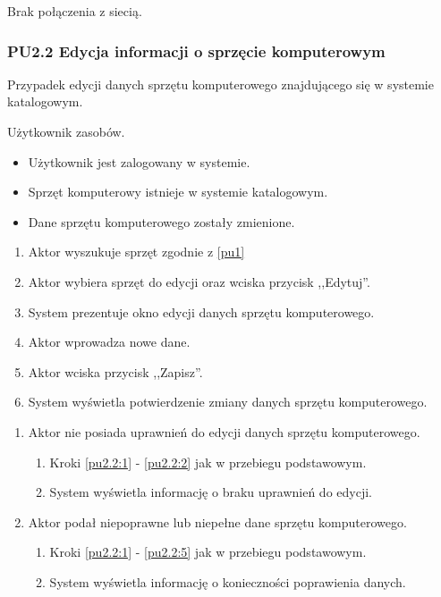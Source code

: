 Brak połączenia z siecią.



\subsubsection{PU2.2 Edycja informacji o sprzęcie komputerowym}

Przypadek edycji danych sprzętu komputerowego znajdującego się w systemie katalogowym.

Użytkownik zasobów.

\begin{itemize}
\item Użytkownik jest zalogowany w systemie.
\item Sprzęt komputerowy istnieje w systemie katalogowym.
\end{itemize}

\begin{itemize}
\item Dane sprzętu komputerowego zostały zmienione.
\end{itemize}

\begin{enumerate}
\item \label{pu2.2:1} Aktor wyszukuje sprzęt zgodnie z \ref{pu1}
\item \label{pu2.2:2} Aktor wybiera sprzęt do edycji oraz wciska przycisk ,,Edytuj''.
\item System prezentuje okno edycji danych sprzętu komputerowego.
\item Aktor wprowadza nowe dane.
\item \label{pu2.2:5} Aktor wciska przycisk ,,Zapisz''.
\item System wyświetla potwierdzenie zmiany danych sprzętu komputerowego.
\end{enumerate}

\begin{enumerate}
\item Aktor nie posiada uprawnień do edycji danych sprzętu komputerowego.
	\begin{enumerate}[label*=\arabic*.]
		\item Kroki \ref{pu2.2:1} - \ref{pu2.2:2} jak w przebiegu podstawowym.
		\item System wyświetla informację o braku uprawnień do edycji.
	\end{enumerate}
\item Aktor podał niepoprawne lub niepełne dane sprzętu komputerowego.
	\begin{enumerate}[label*=\arabic*.]
		\item Kroki \ref{pu2.2:1} - \ref{pu2.2:5} jak w przebiegu podstawowym.
		\item System wyświetla informację o konieczności poprawienia danych.
	\end{enumerate}
\end{enumerate}

